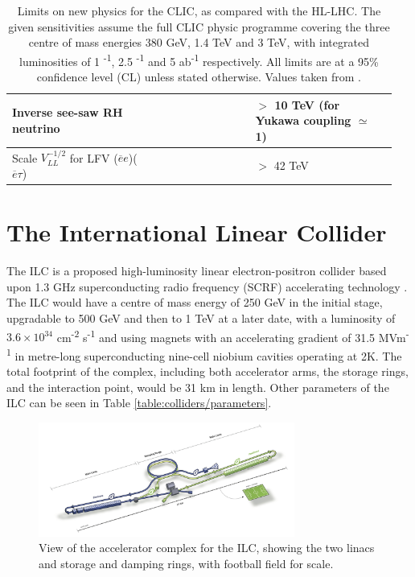 \begin{table}[b]
\begin{tabular}{p{0.35\linewidth}  p{0.25\linewidth} p{0.35\linewidth}}
	Inverse see-saw RH neutrino &  & $>$ 10 TeV (for Yukawa coupling $\simeq$ 1) \\ \hline

	Scale $V^{-1/2}_{LL}$ for LFV ($\overline{e}e$)($\overline{e}\tau$) & & $>$ 42 TeV \\ \hline \hline
	\end{tabular}
	\caption{Limits on new physics for the \acrlong{CLIC}, as compared with the \acrfull{HL-LHC}. The given sensitivities assume the full \acrshort{CLIC} physic programme covering the three centre of mass energies 380 GeV, 1.4 TeV and 3 TeV, with integrated luminosities of 1 \textsuperscript{-1}, 2.5 \textsuperscript{-1} and 5 ab\textsuperscript{-1} respectively. All limits are at a 95\% confidence level (CL) unless stated otherwise. Values taken from \cite{clic-yellow}.}
	\label{table:colliders/precisions}
\end{table}


\section{The International Linear Collider}
The \acrfull{ILC} is a proposed high-luminosity linear electron-positron collider based upon 1.3 GHz superconducting radio frequency (\acrshort{SCRF}) accelerating technology \cite{ilc-tdr-summary}. The ILC would have a centre of mass energy of 250 GeV in the initial stage, upgradable to 500 GeV and then to 1 TeV at a later date, with a luminosity of $3.6\times 10^{34}$ cm\textsuperscript{-2} s\textsuperscript{-1} and using magnets with an accelerating gradient of 31.5 MVm\textsuperscript{-1} in metre-long superconducting nine-cell niobium cavities operating at 2K. The total footprint of the complex, including both accelerator arms, the storage rings, and the interaction point, would be 31 km in length. Other parameters of the \acrshort{ILC} can be seen in Table \ref{table:colliders/parameters}.

\begin{figure}[h]
	\centering
	\includegraphics[width=0.75\textwidth]{../Pictures/ILC-Schematic.jpg}
	\caption{View of the accelerator complex for the \acrlong{ILC}, showing the two linacs and storage and damping rings, with football field for scale.}
	\label{figure:colliders/ILC/main}
\end{figure}

